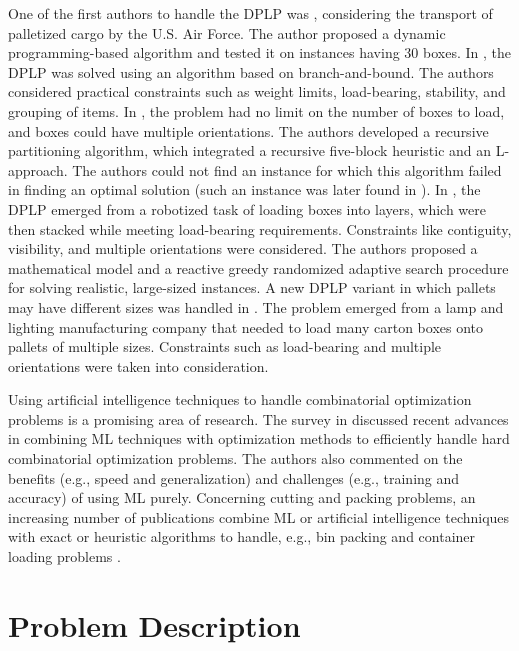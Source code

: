 \documentclass[runningheads]{llncs}
\begin{document}
One of the first authors to handle the DPLP was \cite{Hodgson1982}, considering the transport of palletized cargo by the U.S. Air Force. The author proposed a dynamic programming-based algorithm and tested it on instances having 30 boxes.  
%
In \cite{TERNO2000}, the DPLP was solved using an algorithm based on branch-and-bound. The authors considered practical constraints such as weight limits, load-bearing, stability, and grouping of items.
%
In \cite{Birgin12}, the problem had no limit on the number of boxes to load, and boxes could have multiple orientations. The authors developed a recursive partitioning algorithm, which integrated a recursive five-block heuristic and an L-approach. The authors could not find an instance for which this algorithm failed in finding an optimal solution (such an instance was later found in \cite{TFW2015}). In \cite{Calzavara2021}, the DPLP emerged from a robotized task of loading boxes into layers, which were then stacked while meeting load-bearing requirements. Constraints like contiguity, visibility, and multiple orientations were considered. The authors proposed a mathematical model and a reactive greedy randomized adaptive search procedure for solving realistic, large-sized instances. A new DPLP variant in which pallets may have different sizes was handled in \cite{Mungwattana2023}. The problem emerged from a lamp and lighting manufacturing company that needed to load many carton boxes onto pallets of multiple sizes. Constraints such as load-bearing and multiple orientations were taken into consideration. 

Using artificial intelligence techniques to handle combinatorial optimization problems is a promising area of research. The survey in \cite{BENGIO2021} discussed recent advances in combining ML techniques with optimization methods to efficiently handle hard combinatorial optimization problems. The authors also commented on the benefits (e.g., speed and generalization) and challenges (e.g., training and accuracy) of using ML purely. Concerning cutting and packing problems, an increasing number of publications combine ML or artificial intelligence techniques with exact or heuristic algorithms to handle, e.g., bin packing \cite{Fang2023} and container loading problems \cite{QUE2023}. 


\section{Problem Description \label{sec3}} 
\end{document}
